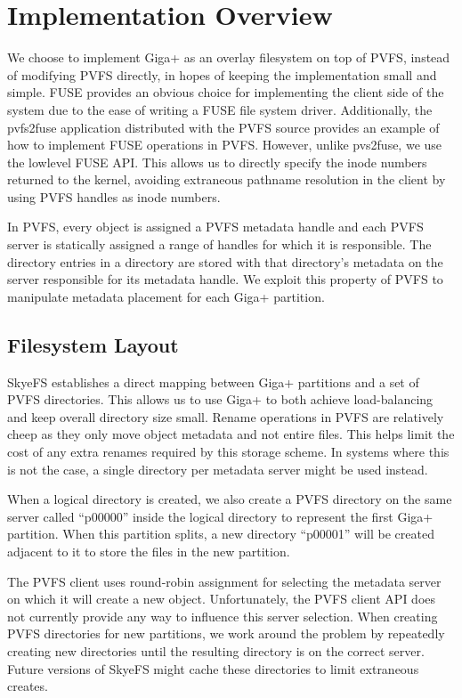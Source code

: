 \documentclass[twocolumn,letterpaper]{article}
\begin{document}
\section{Implementation Overview}
We choose to implement Giga+ as an overlay filesystem on top of PVFS, instead
of modifying PVFS directly, in hopes of keeping the implementation small and
simple.  FUSE provides an obvious choice for implementing the client side of
the system due to the ease of writing a FUSE file system driver.
Additionally, the pvfs2\-fuse application distributed with the PVFS source
provides an example of how to implement FUSE operations in PVFS.  However,
unlike pvs2\-fuse, we use the lowlevel FUSE API.  This allows us to directly
specify the inode numbers returned to the kernel, avoiding extraneous pathname
resolution in the client by using PVFS handles as inode numbers.

In PVFS, every object is assigned a PVFS metadata handle and each PVFS server
is statically assigned a range of handles for which it is responsible.  
The directory entries in a directory are stored with that directory's metadata
on the server responsible for its metadata handle.  We exploit this property
of PVFS to manipulate metadata placement for each Giga+ partition.

\subsection{Filesystem Layout}
SkyeFS establishes a direct mapping between Giga+ partitions and a set of PVFS
directories.  This allows us to use Giga+ to both achieve load-balancing and
keep overall directory size small.  Rename operations in PVFS are relatively
cheep as they only move object metadata and not entire files.  This helps limit
the cost of any extra renames required by this storage scheme.  In systems
where this is not the case, a single directory per metadata server might be
used instead.

When a logical directory is created, we also create a PVFS directory on the
same server called ``p00000'' inside the logical directory to represent the
first Giga+ partition.  When this partition splits, a new directory ``p00001''
will be created adjacent to it to store the files in the new partition.  

The PVFS client uses round-robin assignment for selecting the metadata server
on which it will create a new  object.  Unfortunately, the PVFS client API
does not currently provide any way to influence this server selection.  When
creating PVFS directories for new partitions, we work around the problem by
repeatedly creating new directories until the resulting directory is on the
correct server.  Future versions of SkyeFS might cache these directories to
limit extraneous creates.
\end{document}
